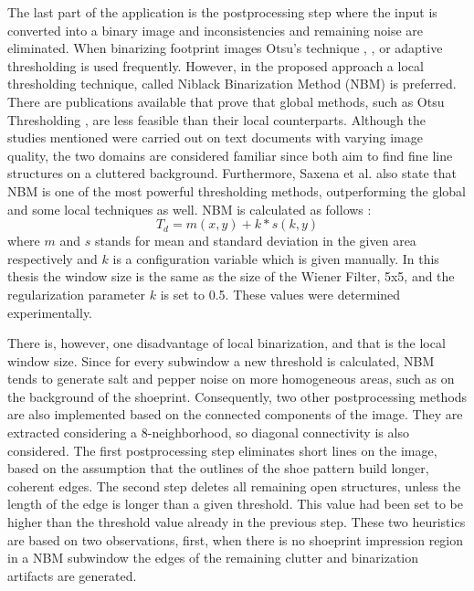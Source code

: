 \documentclass[draft,final]{vutinfth} %
\begin{document}
\par
The last part of the application is the postprocessing step where the input is converted into a binary image and inconsistencies and remaining noise are eliminated.
When binarizing footprint images Otsu's technique \cite{algarni2008novel}, \cite{alizadeh2017automatic}, \cite{wu2019crime} or adaptive thresholding \cite{wang2014automatic} is used frequently.
However, in the proposed approach a local thresholding technique, called Niblack Binarization Method (NBM) \cite{niblack1985introduction} is preferred.
There are publications available \cite{som2011application} that prove that global methods, such as Otsu Thresholding \cite{otsu1979threshold}, are less feasible than their local counterparts.
Although the studies mentioned were carried out on text documents with varying image quality, the two domains are considered familiar since both aim to find fine line structures on a cluttered background.
Furthermore, Saxena et al. \cite{saxena2019niblack} also state that NBM is one of the most powerful thresholding methods, outperforming the global and some local techniques as well. 
NBM  is calculated as follows \cite{saxena2019niblack}:
\begin{equation}
T_d = m(x,y) + k * s(k, y)
\end{equation}
where $m$ and $s$ stands for mean and standard deviation in the given area respectively and $k$ is a configuration variable which is given manually. 
In this thesis the window size is the same as the size of the Wiener Filter, 5x5, and the regularization parameter $k$ is set to 0.5. These values were determined experimentally.
\par
There is, however, one disadvantage of local binarization, and that is the local window size.
Since for every subwindow a new threshold is calculated, NBM tends to generate salt and pepper noise on more homogeneous areas, such as on the background of the shoeprint.
Consequently, two other postprocessing methods are also implemented based on the connected components of the image.
They are extracted considering a 8-neighborhood, so diagonal connectivity is also considered.
The first postprocessing step eliminates short lines on the image, based on the assumption that the outlines of the shoe pattern build longer, coherent edges.
The second step deletes all remaining open structures, unless the length of the edge is longer than a given threshold.
This value had been set to be higher than the threshold value already in the previous step.
These two heuristics are based on two observations, first, when there is no shoeprint impression region in a NBM subwindow the edges of the remaining clutter and binarization artifacts are generated.
\end{document}
